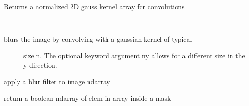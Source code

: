 \documentclass[letterpaper,10pt,english]{sphinxmanual}
\begin{document}

\begin{fulllineitems}
\label{\detokenize{PeakSearch:LaueTools.readmccd.gauss_kern}}
Returns a normalized 2D gauss kernel array for convolutions

\end{fulllineitems}


\begin{fulllineitems}
\label{\detokenize{PeakSearch:LaueTools.readmccd.blur_image}}~\begin{description}
\item[{blurs the image by convolving with a gaussian kernel of typical}] \leavevmode
size n. The optional keyword argument ny allows for a different
size in the y direction.

\end{description}

\end{fulllineitems}


\begin{fulllineitems}
\label{\detokenize{PeakSearch:LaueTools.readmccd.blurCCD}}
apply a blur filter to image ndarray

\end{fulllineitems}


\begin{fulllineitems}
\label{\detokenize{PeakSearch:LaueTools.readmccd.circularMask}}
return a boolean ndarray of elem in array inside a mask

\end{fulllineitems}
\end{document}
